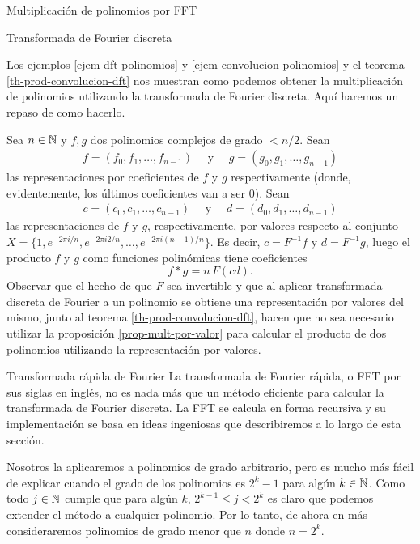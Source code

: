 \begin{chapter}{Multiplicación de polinomios por FFT}
\begin{section}{Transformada de Fourier discreta}
        \begin{ejemplo*} Los ejemplos \ref{ejem-dft-polinomios} y \ref{ejem-convolucion-polinomios} y  el teorema \ref{th-prod-convolucion-dft} nos  muestran como podemos obtener  la multiplicación de polinomios utilizando la transformada de Fourier discreta. Aquí haremos un repaso de como hacerlo.

            Sea $n \in \mathbb N$ y $f, g$ dos polinomios complejos de grado $< n/2$. Sean 
            \begin{align*}
                f = (f_0, f_1, \ldots, f_{n-1}) \quad \text{ y } \quad g = (g_0, g_1, \ldots, g_{n-1})
            \end{align*}
            las representaciones por coeficientes de $f$ y $g$ respectivamente (donde, evidentemente, los últimos coeficientes van a ser $0$). Sean 
            \begin{align*}
                c = (c_0, c_1, \ldots, c_{n-1}) \quad \text{ y } \quad d = (d_0, d_1, \ldots, d_{n-1})
            \end{align*}
            las representaciones de $f$ y $g$, respectivamente, por valores respecto al conjunto $X = \{1, e^{-2\pi i /{n}},e^{-2\pi i 2/{n}}, \ldots,e^{-2\pi i {(n-1)}/{n}} \}$. Es decir, $c = F^{-1}f$ y $d = F^{-1}g$,  luego el producto $f$ y $g$ como funciones polinómicas tiene coeficientes
            \begin{equation*}
                f * g = n\,  F(cd). 
            \end{equation*}
            Observar que el hecho de que $F$ sea invertible y  que al aplicar transformada discreta de Fourier a un polinomio se obtiene una representación por valores del mismo, junto al teorema \ref{th-prod-convolucion-dft}, hacen que no sea necesario utilizar la proposición \ref{prop-mult-por-valor} para calcular el producto de dos polinomios utilizando la representación por valores. 
        \end{ejemplo*}
        
    \end{section}

    \begin{section}{Transformada rápida de Fourier} La transformada de Fourier rápida, o FFT por sus siglas en inglés, no es nada más que un método eficiente para calcular la transformada de Fourier discreta. La FFT se calcula en forma recursiva y su implementación se basa en ideas ingeniosas que describiremos a lo largo de esta sección. 

        Nosotros la aplicaremos a polinomios de grado arbitrario, pero es mucho más fácil de explicar cuando el grado de los polinomios es $2^k -1$  para algún $k \in \mathbb N$. Como todo $j \in \mathbb N$ cumple que para algún $k$, $2^{k-1} \le j < 2^k$ es claro que podemos extender el método a cualquier polinomio. Por lo tanto, de ahora en más consideraremos polinomios de grado menor que $n$ donde  $n = 2^k$. 


\end{section}
\end{chapter}
